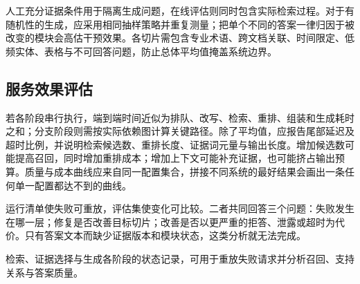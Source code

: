 \documentclass[../textbook.tex]{subfiles}
\begin{document}
人工充分证据条件用于隔离生成问题，在线评估则同时包含实际检索过程。对于有随机性的生成，应采用相同抽样策略并重复测量；把单个不同的答案一律归因于被改变的模块会高估干预效果。各切片需包含专业术语、跨文档关联、时间限定、低频实体、表格与不可回答问题，防止总体平均值掩盖系统边界。

\subsection{服务效果评估}
若各阶段串行执行，端到端时间近似为排队、改写、检索、重排、组装和生成耗时之和；分支阶段则需按实际依赖图计算关键路径。除了平均值，应报告尾部延迟及超时比例，并说明检索候选数、重排长度、证据词元量与输出长度。增加候选数可能提高召回，同时增加重排成本；增加上下文可能补充证据，也可能挤占输出预算。质量与成本曲线应来自同一配置集合，拼接不同系统的最好结果会画出一条任何单一配置都达不到的曲线。

运行清单使失败可重放，评估集使变化可比较。二者共同回答三个问题：失败发生在哪一层；修复是否改善目标切片；改善是否以更严重的拒答、泄露或超时为代价。只有答案文本而缺少证据版本和模块状态，这类分析就无法完成。



检索、证据选择与生成各阶段的状态记录，可用于重放失败请求并分析召回、支持关系与答案质量。




\chapterreferences
\myendchapterdocument
\end{document}
